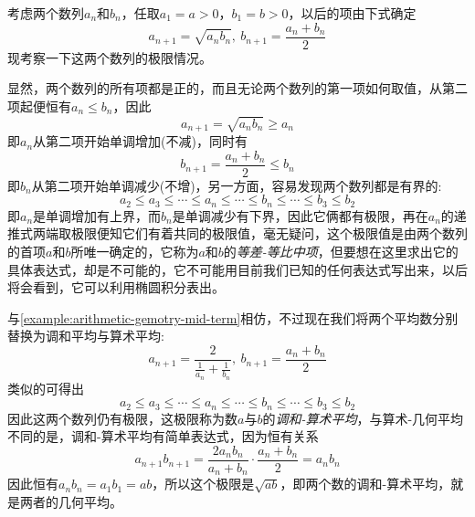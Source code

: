 \begin{example}[等差-等比中项]
  \label{example:arithmetic-gemotry-mid-term}
  考虑两个数列$a_n$和$b_n$，任取$a_1=a>0$，$b_1=b>0$，以后的项由下式确定
  \[ a_{n+1} = \sqrt{a_nb_n}, \  b_{n+1}=\frac{a_n+b_n}{2} \]
  现考察一下这两个数列的极限情况。

  显然，两个数列的所有项都是正的，而且无论两个数列的第一项如何取值，从第二项起便恒有$a_n \leqslant b_n$，因此
  \[ a_{n+1} = \sqrt{a_nb_n} \geqslant a_n \]
  即$a_n$从第二项开始单调增加(不减)，同时有
  \[ b_{n+1} = \frac{a_n+b_n}{2} \leqslant b_n \]
  即$b_n$从第二项开始单调减少(不增)，另一方面，容易发现两个数列都是有界的:
  \[ a_2 \leqslant a_3 \leqslant \cdots \leqslant a_n \leqslant \cdots \leqslant b_n \leqslant \cdots \leqslant b_3 \leqslant b_2  \]
  即$a_n$是单调增加有上界，而$b_n$是单调减少有下界，因此它俩都有极限，再在$a_n$的递推式两端取极限便知它们有着共同的极限值，毫无疑问，这个极限值是由两个数列的首项$a$和$b$所唯一确定的，它称为$a$和$b$的\emph{等差-等比中项}，但要想在这里求出它的具体表达式，却是不可能的，它不可能用目前我们已知的任何表达式写出来，以后将会看到，它可以利用椭圆积分表出。
\end{example}

\begin{example}[调和-算术中项]
  \label{example:harmonic-arithmetic-mid-term}
  与\autoref{example:arithmetic-gemotry-mid-term}相仿，不过现在我们将两个平均数分别替换为调和平均与算术平均:
  \[ a_{n+1} = \frac{2}{\frac{1}{a_n}+\frac{1}{b_n}}, \  b_{n+1} = \frac{a_n+b_n}{2} \]
  类似的可得出
  \[ a_2 \leqslant a_3 \leqslant \cdots \leqslant a_n \leqslant \cdots \leqslant b_n \leqslant \cdots \leqslant b_3 \leqslant b_2  \]
  因此这两个数列仍有极限，这极限称为数$a$与$b$的\emph{调和-算术平均}，与算术-几何平均不同的是，调和-算术平均有简单表达式，因为恒有关系
  \[ a_{n+1}b_{n+1} = \frac{2a_nb_n}{a_n+b_n} \cdot \frac{a_n+b_n}{2} = a_nb_n \]
  因此恒有$a_nb_n=a_1b_1=ab$，所以这个极限是$\sqrt{ab}$，即两个数的调和-算术平均，就是两者的几何平均。
\end{example}

